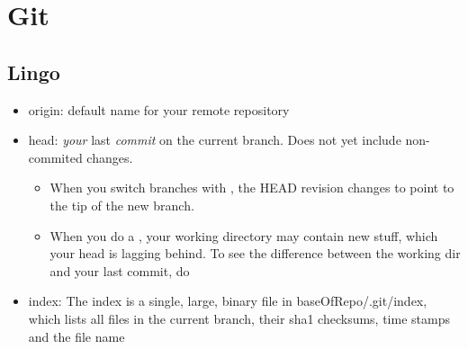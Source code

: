 \section{Git}

\subsection{Lingo}
\begin{itemize}

    \item origin: default name for your remote repository
    
    \item head: \emph{your} last \emph{commit} on the current branch. Does not yet include non-commited changes. 
        \begin{itemize}
            \item When you switch branches with , the HEAD revision changes to point to the tip of the new
            branch.
            \item When you do a , your working directory may contain new stuff, which your head is lagging behind. To see the difference between the working dir and your last commit, do 
        \end{itemize}
        
    \item index: The index is a single, large, binary file in baseOfRepo/.git/index, which lists all files in the current branch, their sha1 checksums, time stamps and the file name
    
\end{itemize}



